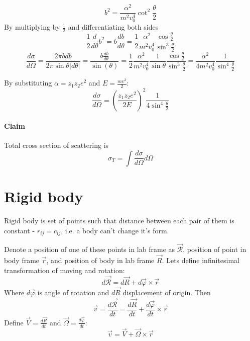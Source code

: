 $$b^2 = \frac{\alpha^2}{m^2v_0^4}\cot^2 \frac{\theta}{2}$$
By multiplying by $\frac{1}{2}$ and differentiating both sides
$$\frac{1}{2}\frac{d}{d\theta}b^2 = b\frac{db}{d\theta} = \frac{1}{2} \frac{\alpha^2}{m^2v_0^4}\frac{\cos \frac{\theta}{2}}{\sin^3  \frac{\theta}{2}}$$
$$\frac{d\sigma}{d\Omega} = \frac{2\pi b db}{2\pi \sin \theta |d\theta|} = \frac{ b\frac{db}{d\theta}}{\sin(\theta)} = \frac{1}{2} \frac{\alpha^2}{m^2v_0^4}\frac{1}{\sin\theta} \frac{\cos \frac{\theta}{2}}{\sin^3  \frac{\theta}{2}} = \frac{\alpha^2}{4m^2v_0^4}\frac{1}{\sin^4  \frac{\theta}{2}} $$

By substituting $\alpha = z_1z_2e^2$ and $E= \frac{mv^2}{2}$:
$$\frac{d\sigma}{d\Omega}  =\left( \frac{z_1z_2 e^2}{2E}\right)^2\frac{1}{4\sin^4  \frac{\theta}{2}} $$

\paragraph{Claim}
Total cross section of scattering is
$$\sigma_T = \int \frac{d\sigma}{d\Omega} d\Omega$$

\section{Rigid body}
Rigid body is set of points such that distance between each pair of them is constant - $r_{ij} = c_{ij}$, i.e. a body can't change it's form. 

Denote a position of one of these points in lab frame as $\vec{\mathcal{R}}$, position of point in body frame $\vec{r}$, and position of body in lab frame $\vec{R}$. Lets define infinitesimal transformation of moving and rotation:
$$d\vec{\mathcal{R}} = d\vec{R} + d\vec{\varphi} \times \vec{r}$$ 
Where $d\vec{\varphi}$ is angle of rotation and $d\vec{R} $ displacement of origin.
Then
$$\vec{v} = \frac{d\vec{\mathcal{R}}}{dt} = \frac{d\vec{R}}{dt} + \frac{d\vec{\varphi}}{dt} \times \vec{r}$$
Define $\vec{V} = \frac{d\vec{R}}{dt} $ and $\vec{\Omega} = \frac{d\vec{\varphi}}{dt}$:
$$\vec{v} = \vec{V} + \vec{\Omega} \times \vec{r}$$